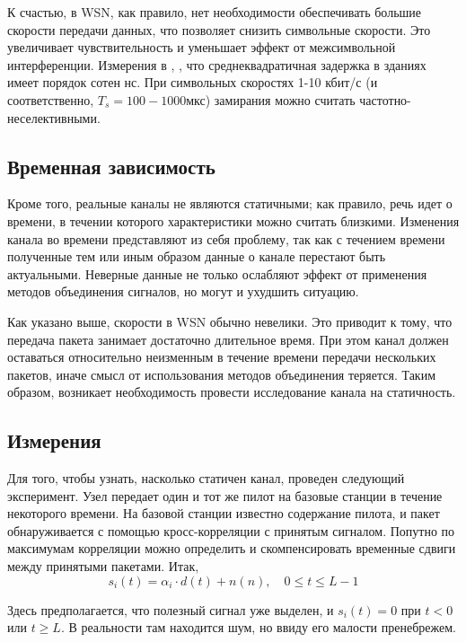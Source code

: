 \documentclass[a4paper,12pt,oneside]{scrartcl}
\begin{document}
К счастью, в WSN, как правило, нет необходимости обеспечивать большие скорости передачи данных, что позволяет снизить символьные скорости. 
Это увеличивает чувствительность и уменьшает эффект от межсимвольной интерференции. 
Измерения в \cite{A8}, \cite{A9}, что среднеквадратичная задержка в зданиях имеет порядок сотен нс. 
При символьных скоростях 1-10 кбит/с (и соответственно, $T_s = 100-1000$мкс) замирания можно считать частотно-неселективными.

\subsection{Временная зависимость}

Кроме того, реальные каналы не являются статичными; как правило, речь идет о времени, в течении которого характеристики можно считать близкими. 
Изменения канала во времени представляют из себя проблему, так как с течением времени полученные тем или иным образом данные о канале перестают быть актуальными. 
Неверные данные не только ослабляют эффект от применения методов объединения сигналов, но могут и ухудшить ситуацию. 

Как указано выше, скорости в WSN обычно невелики. 
Это приводит к тому, что передача пакета занимает достаточно длительное время. 
При этом канал должен оставаться относительно неизменным в течение времени передачи нескольких пакетов, иначе смысл от использования методов объединения теряется.
Таким образом, возникает необходимость провести исследование канала на статичность.
\subsection{Измерения}
Для того, чтобы узнать, насколько статичен канал, проведен следующий эксперимент. 
Узел передает один и тот же пилот на базовые станции в течение некоторого времени. 
На базовой станции известно содержание пилота, и пакет обнаруживается с помощью кросс-корреляции с принятым сигналом. 
Попутно по максимумам корреляции можно определить и скомпенсировать временные сдвиги между принятыми пакетами. 
Итак,
\begin{equation*}
s_i\left(t\right) = \alpha_i\cdot d\left(t\right)+n\left(n\right),\quad 0\leq t\leq L-1
\end{equation*}

Здесь предполагается, что полезный сигнал уже выделен, и $s_i(t) = 0$ при $t<0$ или $t\geq L$. В реальности там находится шум, но ввиду его малости пренебрежем.
\end{document}
